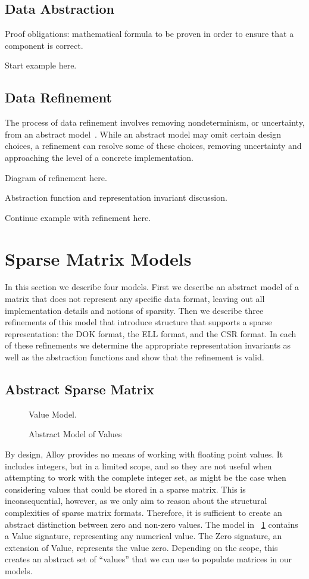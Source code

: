 \documentclass[11pt,conference]{IEEEtran}
\begin{document}
\subsection{Data Abstraction}

Proof obligations: mathematical formula to be proven in order to ensure that a component is correct.

Start example here.

\subsection{Data Refinement}

The process of data refinement involves removing nondeterminism, or uncertainty, from an abstract model~\cite{woodcock1996}.  While an abstract model may omit certain design choices, a refinement can resolve some of these choices, removing uncertainty and approaching the level of a concrete implementation.

Diagram of refinement here.

Abstraction function and representation invariant discussion.

Continue example with refinement here.

\section{Sparse Matrix Models}

In this section we describe four models.  First we describe an abstract model of a matrix that does not represent any specific data format, leaving out all implementation details and notions of sparsity. Then we describe three refinements of this model that introduce structure that supports a sparse representation: the DOK format, the ELL format, and the CSR format.  In each of these refinements we determine the appropriate representation invariants as well as the abstraction functions and show that the refinement is valid.

\subsection{Abstract Sparse Matrix}

\begin{figure}
\centering
Value Model.
\caption{Abstract Model of Values}
\label{mod:value}
\end{figure}

By design, Alloy provides no means of working with floating point values.  It includes integers, but in a limited scope, and so they are not useful when attempting to work with the complete integer set, as might be the case when considering values that could be stored in a sparse matrix.  This is inconsequential, however, as we only aim to reason about the structural complexities of sparse matrix formats.  Therefore, it is sufficient to create an abstract distinction between zero and non-zero values.  The model in \figurename~\ref{mod:value} contains a Value signature, representing any numerical value.  The Zero signature, an extension of Value, represents the value zero.  Depending on the scope, this creates an abstract set of ``values'' that we can use to populate matrices in our models.
\end{document}
